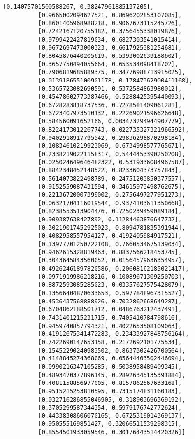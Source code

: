 \documentclass[11pt]{article}
\begin{document}
\begin{Verbatim}[commandchars=\\\{\}]
          [0.14075701500588267, 0.38247961885137205],
          [0.9665002094627521, 0.8696202853107085],
          [0.8601405968988218, 0.9067673115245726],
          [0.7242167120755182, 0.3756455338019876],
          [0.9799422427819034, 0.6827303541015414],
          [0.9672697473000323, 0.6617925381254681],
          [0.8045876440205619, 0.5393002639188602],
          [0.3657750494055664, 0.653534098418702],
          [0.7906819685889375, 0.34776988713915025],
          [0.013918655100901178, 0.17847362900411168],
          [0.5365723082690591, 0.5372584863980012],
          [0.45478602773387466, 0.5288425395440093],
          [0.6728283818737536, 0.7278581409061281],
          [0.6723407973510132, 0.22269021596626648],
          [0.584560091652166, 0.003473294944907779],
          [0.8224173012267743, 0.022735327321966592],
          [0.9402918917795542, 0.29836298870298184],
          [0.10834610219923069, 0.6734998577765671],
          [0.23382190221158317, 0.5444453390250208],
          [0.025024649646482322, 0.5319336084967587],
          [0.8842348452148522, 0.8233604373757843],
          [0.5614073822498789, 0.24751203850377557],
          [0.9152559087431594, 0.34615973498762675],
          [0.22136720007399002, 0.2756497277951273],
          [0.06321704116019544, 0.9374103611350668],
          [0.8238553513904476, 0.7250239459089184],
          [0.909387638427892, 0.11284463876647732],
          [0.30219017452925023, 0.8094781835391944],
          [0.4082958557954127, 0.4192405984917521],
          [0.13977701250722108, 0.7660534675139034],
          [0.9462615328819463, 0.8837566218453745],
          [0.3043645843560052, 0.01564579636354957],
          [0.49262461897820586, 0.20608162185021417],
          [0.0971919986218216, 0.10089671309250703],
          [0.8872593085285023, 0.03357627575428079],
          [0.13566404870633653, 0.5977848967315527],
          [0.4536437568888926, 0.7032862668649287],
          [0.6704862188501712, 0.0486763212437491],
          [0.7431401215231715, 0.7405410784798616],
          [0.9459740857794321, 0.4022653508109063],
          [0.41912675341472283, 0.23433927848756164],
          [0.7422690147653158, 0.2172692101775534],
          [0.15452290240983502, 0.8637302426700564],
          [0.4148845274368069, 0.05644403502446094],
          [0.0990216347105285, 0.5038958489409345],
          [0.4893470377896145, 0.28926345135391884],
          [0.4081158856977005, 0.8157862567633168],
          [0.9515215253810595, 0.7315174831160183],
          [0.032716286855046905, 0.318903696369192],
          [0.3705299587344354, 0.5979176742772624],
          [0.44338308606070165, 0.6725319014369137],
          [0.950555169851427, 0.32066511539298315],
          [0.8554501933059546, 0.30176443514420326]]
\end{Verbatim}
            

    
    
    
    
\end{document}
